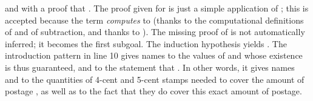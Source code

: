 \begin{itemize}
and with a proof that . The proof given for
 is just a simple application of ; this is
accepted because the term  \emph{computes} to
 (thanks to the computational definitions of \C{<} and of
subtraction, and thanks to ). The missing proof
of  is not automatically inferred; it becomes the first
subgoal. The induction hypothesis yields
. The introduction
pattern in line 10 gives names to the values of  and 
whose existence is thus guaranteed, and to the statement that
. In other words, it gives names  and
 to the quantities of 4-cent and 5-cent stamps needed to cover
the amount of postage , as well as to the fact that they do
cover this exact amount of postage.
\end{itemize}
